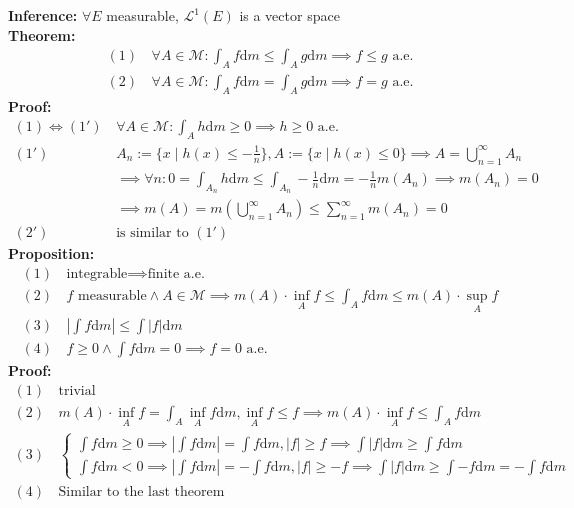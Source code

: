 \documentclass{article}
\newcommand{\sumninf}{\displaystyle\sum_{n=1}^\infty}
\newcommand{\cupninf}{\displaystyle\bigcup_{n=1}^\infty}
\newcommand{\0}{{\bf{0}}}
\newcommand{\1}{{\bf{1}}}
\newcommand{\alev}{\mbox{ a.e.}}
\newcommand{\dint}{\displaystyle\int}
\newcommand{\dif}{\mbox{d}}
\begin{document}
\textbf{Inference:} $\forall E$ measurable, $\mathcal{L}^1(E)$ is a vector space\\
\textbf{Theorem:}
\begin{equation}
\begin{split}
    (1)\,&\forall A\in\mathcal{M}:\int_Af\dif m\le\int_Ag\dif m\implies f\le g\alev\\
    (2)\,&\forall A\in\mathcal{M}:\int_Af\dif m=\int_Ag\dif m\implies f=g\alev
\end{split}
\end{equation}
\textbf{Proof:}
\begin{equation}
\begin{split}
    (1)\iff(1')\,&\forall A\in\mathcal{M}:\int_Ah\dif m\geq0\implies h\geq0\alev\\
    (1')\,&A_n:=\{x\mid h(x)\le-\frac{1}{n}\},A:=\{x\mid h(x)\le 0\}\implies A=\cupninf A_n\\
    &\implies\forall n:0=\int_{A_n}h\dif m\le\int_{A_n}-\frac{1}{n}\dif m=-\frac{1}{n}m(A_n)\implies m(A_n)=0\\
    &\implies m(A)=m(\cupninf A_n)\le\sumninf m(A_n)=0\\
    (2')\,&\mbox{is similar to }(1')
\end{split}
\end{equation}
\textbf{Proposition:}
\begin{equation}
\begin{split}
    (1)\,&\mbox{integrable}\implies\mbox{finite}\alev\\
    (2)\,&f\mbox{ measurable}\land A\in\mathcal{M}\implies m(A)\cdot\inf_Af\le\int_Af\dif m\le m(A)\cdot\sup_Af\\
    (3)\,&\left|\int f\dif m\right|\le\int|f|\dif m\\
    (4)\,&f\geq0\land\int f\dif m=0\implies f=0\alev
\end{split}
\end{equation}
\textbf{Proof:}
\begin{equation}
\begin{split}
    (1)\,&\mbox{trivial}\\
    (2)\,&m(A)\cdot\inf_Af=\int_A\inf_Af\dif m,\inf_Af\le f\implies m(A)\cdot\inf_Af\le\int_Af\dif m\\
    (3)\,&\begin{cases}
        \dint f\dif m\geq0\implies|\dint f\dif m|=\dint f\dif m,|f|\geq f\implies\dint|f|\dif m\geq\dint f\dif m\\
        \dint f\dif m<0\implies|\dint f\dif m|=-\dint f\dif m,|f|\geq -f\implies\dint|f|\dif m\geq\dint-f\dif m=-\dint f\dif m
    \end{cases}\\
    (4)\,&\mbox{Similar to the last theorem}
\end{split}
\end{equation}
\end{document}
